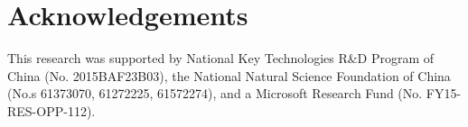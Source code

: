 
\section{Acknowledgements}
This research was supported by National Key Technologies R\&D Program of China (No. 2015BAF23B03), the National Natural Science Foundation of China (No.s 61373070, 61272225, 61572274), and a Microsoft Research Fund (No. FY15-RES-OPP-112). 